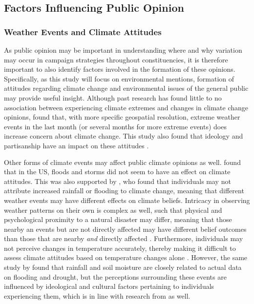 \documentclass[preprint]{elsarticle} %
\begin{document}
\subsection{Factors Influencing Public Opinion}

\subsubsection{Weather Events and Climate Attitudes}

As public opinion may be important in understanding where and why variation may occur in campaign strategies throughout constituencies, it is therefore important to also identify factors involved in the formation of these opinions. Specifically, as this study will focus on environmental mentions, formation of attitudes regarding climate change and environmental issues of the general public may provide useful insight. Although past research has found little to no association between experiencing climate extremes and changes in climate change opinions, \citet{koniskyExtremeWeatherEvents2016} found that, with more specific geospatial resolution, extreme weather events in the last month (or several months for more extreme events) does increase concern about climate change. This study also found that ideology and partisanship have an impact on these attitudes \citep{koniskyExtremeWeatherEvents2016}. 

Other forms of climate events may affect public climate opinions as well. \citet{viscontiEffectDifferentExtreme2024} found that in the US, floods and storms did not seem to have an effect on climate attitudes. This was also supported by \citet{loComeRainShine2015}, who found that individuals may not attribute increased rainfall or flooding to climate change, meaning that different weather events may have different effects on climate beliefs. Intricacy in observing weather patterns on their own is complex as well, such that physical and psychological proximity to a natural disaster may differ, meaning that those nearby an events but are not directly affected may have different belief outcomes than those that are nearby \textit{and} directly affected \citep{siscoEffectsWeatherExperiences2021}. Furthermore, individuals may not perceive changes in temperature accurately, thereby making it difficult to assess climate attitudes based on temperature changes alone \citep{goebbertWeatherClimateWorldviews2012}. However, the same study by \citet{goebbertWeatherClimateWorldviews2012} found that rainfall and soil moisture are closely related to actual data on flooding and drought, but the perceptions surrounding these events are influenced by ideological and cultural factors pertaining to individuals experiencing them, which is in line with research from \citet{osberghausNaturalDisastersClimate2022} as well.
\end{document}
